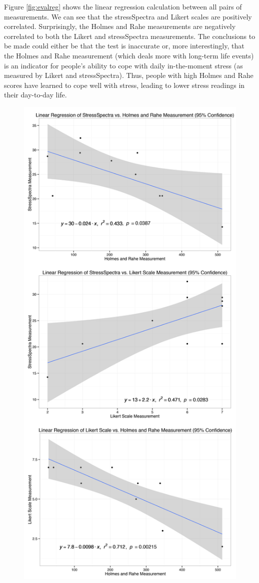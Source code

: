 \documentclass{sigchi}
\begin{document}
Figure \ref{fig:evalreg} shows the linear regression calculation between all pairs of measurements. We can see that the stressSpectra and Likert scales are positively correlated. Surprisingly, the Holmes and Rahe measurements are negatively correlated to both the Likert and stressSpectra measurements. The conclusions to be made could either be that the test is inaccurate or, more interestingly, that the Holmes and Rahe measurement (which deals more with long-term life events) is an indicator for people's ability to cope with daily in-the-moment stress (as measured by Likert and stressSpectra). Thus, people with high Holmes and Rahe scores have learned to cope well with stress, leading to lower stress readings in their day-to-day life. 
\begin{figure}[h!]
\centering
\includegraphics[width=0.9\columnwidth]{evalRegression}

\end{figure}
\end{document}
